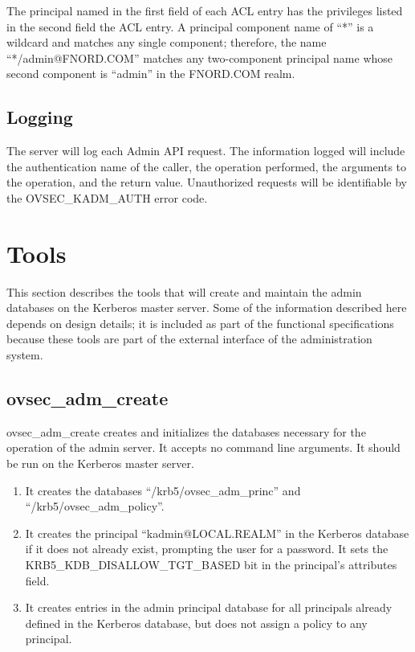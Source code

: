 The principal named in the first field of each ACL entry has the
privileges listed in the second field the ACL entry.  A principal
component name of ``*'' is a wildcard and matches any single
component; therefore, the name ``*/admin@FNORD.COM'' matches any
two-component principal name whose second component is ``admin'' in
the FNORD.COM realm.

\subsection{Logging}

The server will log each Admin API request.  The information logged
will include the authentication name of the caller, the operation
performed, the arguments to the operation, and the return value.
Unauthorized requests will be identifiable by the OVSEC_KADM_AUTH
error code.

\section{Tools}

This section describes the tools that will create and maintain the
admin databases on the Kerberos master server.  Some of the
information described here depends on design details; it is included
as part of the functional specifications because these tools are part
of the external interface of the administration system.

\subsection{ovsec_adm_create}

ovsec_adm_create creates and initializes the databases necessary for
the operation of the admin server.  It accepts no command line
arguments.  It should be run on the Kerberos master server.

\begin{enumerate}
\item It creates the databases ``/krb5/ovsec_adm_princ'' and
``/krb5/ovsec_adm_policy''.

\item It creates the principal ``kadmin@LOCAL.REALM'' in the Kerberos
database if it does not already exist, prompting the user for a
password.  It sets the KRB5_KDB_DISALLOW_TGT_BASED bit in the
principal's attributes field.

\item It creates entries in the admin principal database for all
principals already defined in the Kerberos database, but does not
assign a policy to any principal.
\end{enumerate}


